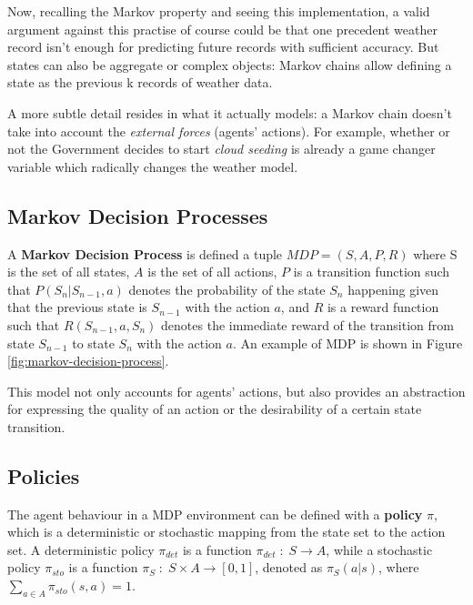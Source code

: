 Now, recalling the Markov property and seeing this implementation, a valid argument against this practise of course could be that one precedent weather record isn't enough for predicting future records with sufficient accuracy. But states can also be aggregate or complex objects: Markov chains allow defining a state as the previous k records of weather data.

A more subtle detail resides in what it actually models: a Markov chain doesn't take into account the \textit{external forces} (agents' actions). For example, whether or not the Government decides to start \textit{cloud seeding} is already a game changer variable which radically changes the weather model.


\subsection{Markov Decision Processes}

A \textbf{Markov Decision Process} is defined a tuple $MDP = (S, A, P, R)$ where S is the set of all states, $A$ is the set of all actions, $P$ is a transition function such that $P(S_n | S_{n-1}, a)$ denotes the probability of the state $S_n$ happening given that the previous state is $S_{n-1}$ with the action $a$, and $R$ is a reward function such that $R(S_{n-1}, a, S_{n})$ denotes the immediate reward of the transition from state $S_{n-1}$ to state $S_n$ with the action $a$. An example of MDP is shown in Figure \ref{fig:markov-decision-process}.

This model not only accounts for agents' actions, but also provides an abstraction for expressing the quality of an action or the desirability of a certain state transition.


\subsection{Policies}

The agent behaviour in a MDP environment can be defined with a \textbf{policy} $\pi$, which is a deterministic or stochastic mapping from the state set to the action set.
A deterministic policy $\pi_{det}$ is a function $\pi_{det} \; : \; S \rightarrow A$, while a stochastic policy $\pi_{sto}$ is a function $\pi _ {S} \; : \; S \times A \rightarrow [0, 1]$, denoted as $\pi _ {S}(a | s)$, where $\sum_{a \in A} \pi _ {sto} (s, a) = 1$.

